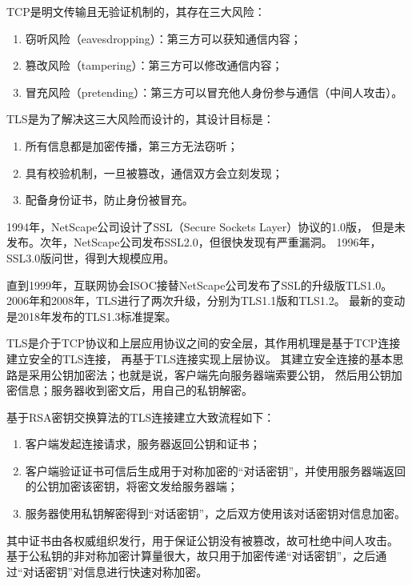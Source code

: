 TCP是明文传输且无验证机制的，其存在三大风险：

\begin{enumerate}
    \item 窃听风险（eavesdropping）：第三方可以获知通信内容；
    \item 篡改风险（tampering）：第三方可以修改通信内容；
    \item 冒充风险（pretending）：第三方可以冒充他人身份参与通信（中间人攻击）。
\end{enumerate}

TLS是为了解决这三大风险而设计的，其设计目标是：

\begin{enumerate}
    \item 所有信息都是加密传播，第三方无法窃听；
    \item 具有校验机制，一旦被篡改，通信双方会立刻发现；
    \item 配备身份证书，防止身份被冒充。
\end{enumerate}

1994年，NetScape公司设计了SSL（Secure Sockets Layer）协议的1.0版，
但是未发布。次年，NetScape公司发布SSL2.0，但很快发现有严重漏洞。
1996年，SSL3.0版问世，得到大规模应用。

直到1999年，互联网协会ISOC接替NetScape公司发布了SSL的升级版TLS1.0。
2006年和2008年，TLS进行了两次升级，分别为TLS1.1版和TLS1.2。
最新的变动是2018年发布的TLS1.3标准提案。

TLS是介于TCP协议和上层应用协议之间的安全层，其作用机理是基于TCP连接建立安全的TLS连接，
再基于TLS连接实现上层协议。
其建立安全连接的基本思路是采用公钥加密法；也就是说，客户端先向服务器端索要公钥，
然后用公钥加密信息；服务器收到密文后，用自己的私钥解密。

基于RSA密钥交换算法\cite{rfc8017}的TLS连接建立大致流程如下：

\begin{enumerate}
    \item 客户端发起连接请求，服务器返回公钥和证书；
    \item 客户端验证证书可信后生成用于对称加密的“对话密钥”，并使用服务器端返回的公钥加密该密钥，将密文发给服务器端；
    \item 服务器使用私钥解密得到“对话密钥”，之后双方使用该对话密钥对信息加密。
\end{enumerate}

其中证书由各权威组织发行，用于保证公钥没有被篡改，故可杜绝中间人攻击。
基于公私钥的非对称加密计算量很大，故只用于加密传递“对话密钥”，之后通过“对话密钥”对信息进行快速对称加密。

